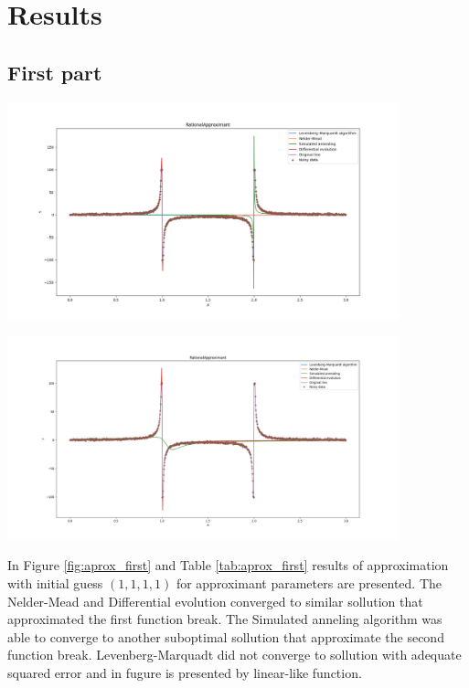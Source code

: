 \section*{Results}

\subsection*{First part}

\begin{center}
    \includegraphics[width=0.85\textwidth]{../results/rational_1_1_1_1.png}
    \label{fig:aprox_first}
\end{center}

\begin{center}
    \includegraphics[width=0.85\textwidth]{../results/rational_second.png}
    \label{fig:aprox_second}
\end{center}

In Figure \ref{fig:aprox_first} and Table \ref{tab:aprox_first} results of approximation with initial guess $(1, 1, 1, 1)$ for approximant parameters are presented. 
The Nelder-Mead and Differential evolution converged to similar sollution that approximated the first function break. The Simulated anneling algorithm was able to converge to
another suboptimal sollution that approximate the second function break. Levenberg-Marquadt did not converge to sollution with adequate squared error and in fugure is presented by linear-like function.

